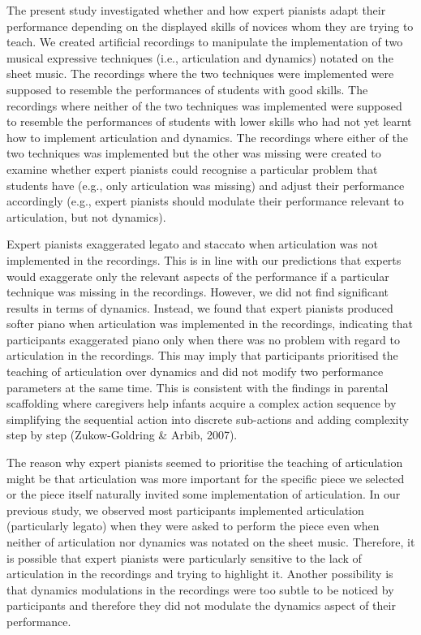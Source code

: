 \documentclass[
  man,floatsintext]{apa6}
\begin{document}
The present study investigated whether and how expert pianists adapt their performance depending on the displayed skills of novices whom they are trying to teach. We created artificial recordings to manipulate the implementation of two musical expressive techniques (i.e., articulation and dynamics) notated on the sheet music. The recordings where the two techniques were implemented were supposed to resemble the performances of students with good skills. The recordings where neither of the two techniques was implemented were supposed to resemble the performances of students with lower skills who had not yet learnt how to implement articulation and dynamics. The recordings where either of the two techniques was implemented but the other was missing were created to examine whether expert pianists could recognise a particular problem that students have (e.g., only articulation was missing) and adjust their performance accordingly (e.g., expert pianists should modulate their performance relevant to articulation, but not dynamics).

Expert pianists exaggerated legato and staccato when articulation was not implemented in the recordings. This is in line with our predictions that experts would exaggerate only the relevant aspects of the performance if a particular technique was missing in the recordings. However, we did not find significant results in terms of dynamics. Instead, we found that expert pianists produced softer piano when articulation was implemented in the recordings, indicating that participants exaggerated piano only when there was no problem with regard to articulation in the recordings. This may imply that participants prioritised the teaching of articulation over dynamics and did not modify two performance parameters at the same time. This is consistent with the findings in parental scaffolding where caregivers help infants acquire a complex action sequence by simplifying the sequential action into discrete sub-actions and adding complexity step by step (Zukow-Goldring \& Arbib, 2007).

The reason why expert pianists seemed to prioritise the teaching of articulation might be that articulation was more important for the specific piece we selected or the piece itself naturally invited some implementation of articulation. In our previous study, we observed most participants implemented articulation (particularly legato) when they were asked to perform the piece even when neither of articulation nor dynamics was notated on the sheet music. Therefore, it is possible that expert pianists were particularly sensitive to the lack of articulation in the recordings and trying to highlight it. Another possibility is that dynamics modulations in the recordings were too subtle to be noticed by participants and therefore they did not modulate the dynamics aspect of their performance.
\end{document}
